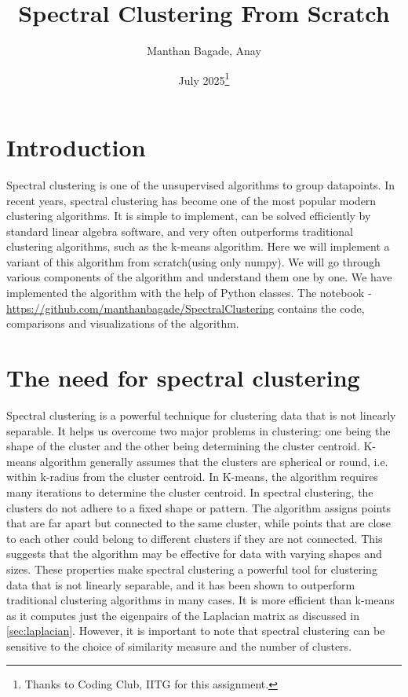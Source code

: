 \documentclass{article}
\title{Spectral Clustering From Scratch}
\author{Manthan Bagade, Anay}
\date{July 2025\thanks{Thanks to Coding Club, IITG for this assignment.}}
\begin{document}
\maketitle

\section{Introduction}
\label{sec:intro}
Spectral clustering is one of the unsupervised algorithms to group datapoints. In recent years, spectral clustering has become one of the most popular modern clustering
algorithms. It is simple to implement, can be solved efficiently by standard linear algebra software,
and very often outperforms traditional clustering algorithms, such as the k-means algorithm. \newline
Here we will implement a variant of this algorithm from scratch(using only numpy). We will go through various components of the algorithm and understand them one by one. We have implemented the algorithm with the help of Python classes. The notebook - \url{https://github.com/manthanbagade/SpectralClustering} contains the code, comparisons and visualizations of the algorithm.

\section{The need for spectral clustering}
\label{sec:need}
Spectral clustering is a powerful technique for clustering data that is not linearly separable. It helps us overcome two major problems in clustering: one being the shape of the cluster and the other being determining the cluster centroid. K-means algorithm generally assumes that the clusters are spherical or round, i.e. within k-radius from the cluster centroid. In K-means, the algorithm requires many iterations to determine the cluster centroid. \newline In spectral clustering, the clusters do not adhere to a fixed shape or pattern. The algorithm assigns points that are far apart but connected to the same cluster, while points that are close to each other could belong to different clusters if they are not connected. This suggests that the algorithm may be effective for data with varying shapes and sizes. These properties make spectral clustering a powerful tool for clustering data that is not linearly separable, and it has been shown to outperform traditional clustering algorithms in many cases. It is more efficient than k-means as it computes just the eigenpairs of the Laplacian matrix as discussed in \autoref{sec:laplacian}. However, it is important to note that spectral clustering can be sensitive to the choice of similarity measure and the number of clusters.
\end{document}
